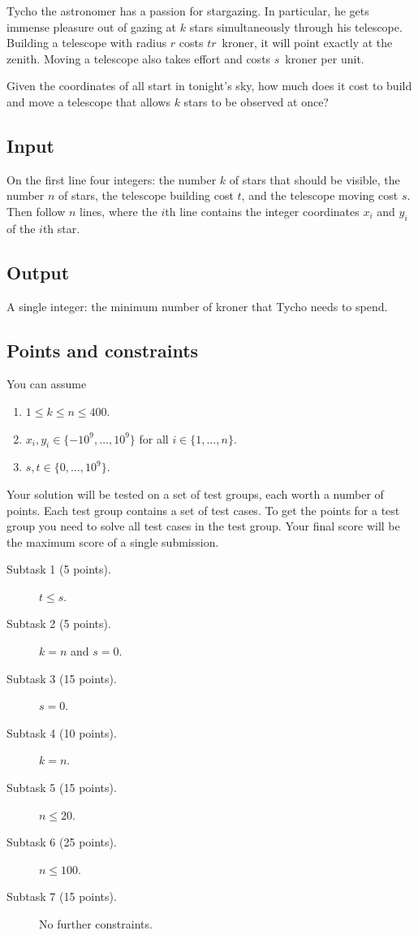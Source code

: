 
Tycho the astronomer has a passion for stargazing.
In particular, he gets immense pleasure out of gazing at $k$ stars simultaneously through his telescope.   
Building a telescope with radius $r$ costs $tr$~kroner, it will point exactly at the zenith.
Moving a telescope also takes effort and costs $s$~kroner per unit.

Given the coordinates of all start in tonight's sky, how much does it cost to build and move a telescope that allows $k$ stars to be observed at once?

\subsection*{Input}

On the first line four integers: the number $k$ of stars that should be visible, the number $n$ of stars, the telescope building cost $t$, and the telescope moving cost $s$.
Then follow $n$ lines, where the $i$th line contains the integer coordinates $x_i$ and $y_i$ of the $i$th star.

\subsection*{Output}

A single integer: the minimum number of kroner that Tycho needs to spend.

\subsection*{Points and constraints}

You can assume 
\begin{enumerate}
\item $1\leq k\leq n\leq 400$.
\item $x_i, y_i\in \{-10^9,\ldots, 10^9\}$ for all $i\in\{1,\ldots,n\}$.
\item $s, t\in \{0,\ldots, 10^9\}$.
\end{enumerate}

Your solution will be tested on a set of test groups, each worth a number of points.
Each test group contains a set of test cases.
To get the points for a test group you need to solve all test cases in the test group.
Your final score will be the maximum score of a single submission.

\begin{description}
\item[Subtask 1 (5 points).] $t\leq s$.
\item[Subtask 2 (5 points).] $k=n$ and $s=0$.
\item[Subtask 3 (15 points).] $s=0$.
\item[Subtask 4 (10 points).] $k=n$.
\item[Subtask 5 (15 points).] $n\leq 20$.
\item[Subtask 6 (25 points).] $n\leq 100$.
\item[Subtask 7 (15 points).] No further constraints.
\end{description}
